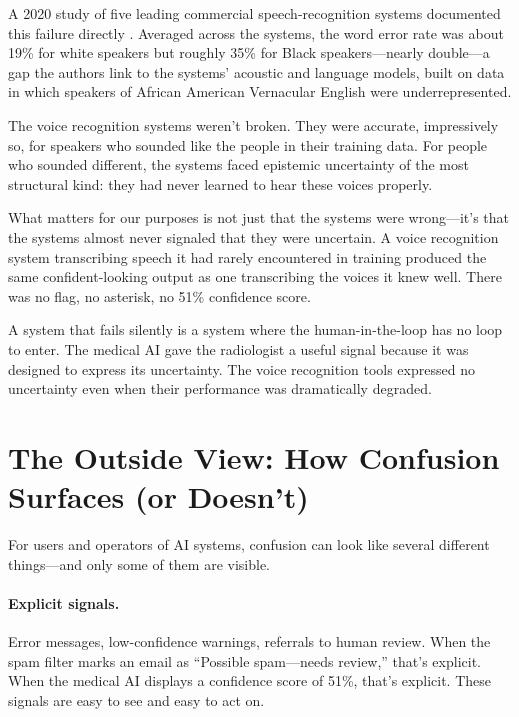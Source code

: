 A 2020 study of five leading commercial speech-recognition systems documented this failure directly \autocite{koenecke2020racial}. Averaged across the systems, the word error rate was about 19\% for white speakers but roughly 35\% for Black speakers---nearly double---a gap the authors link to the systems' acoustic and language models, built on data in which speakers of African American Vernacular English were underrepresented.

The voice recognition systems weren't broken. They were accurate, impressively so, for speakers who sounded like the people in their training data. For people who sounded different, the systems faced epistemic uncertainty of the most structural kind: they had never learned to hear these voices properly.

What matters for our purposes is not just that the systems were wrong---it's that the systems almost never signaled that they were uncertain. A voice recognition system transcribing speech it had rarely encountered in training produced the same confident-looking output as one transcribing the voices it knew well. There was no flag, no asterisk, no 51\% confidence score.

\begin{cautionbox}
A system that fails silently is a system where the human-in-the-loop has no loop to enter. The medical AI gave the radiologist a useful signal because it was designed to express its uncertainty. The voice recognition tools expressed no uncertainty even when their performance was dramatically degraded.
\end{cautionbox}

\section{The Outside View: How Confusion Surfaces (or Doesn't)}

For users and operators of AI systems, confusion can look like several different things---and only some of them are visible.

\paragraph{Explicit signals.} Error messages, low-confidence warnings, referrals to human review. When the spam filter marks an email as ``Possible spam---needs review,'' that's explicit. When the medical AI displays a confidence score of 51\%, that's explicit. These signals are easy to see and easy to act on.

